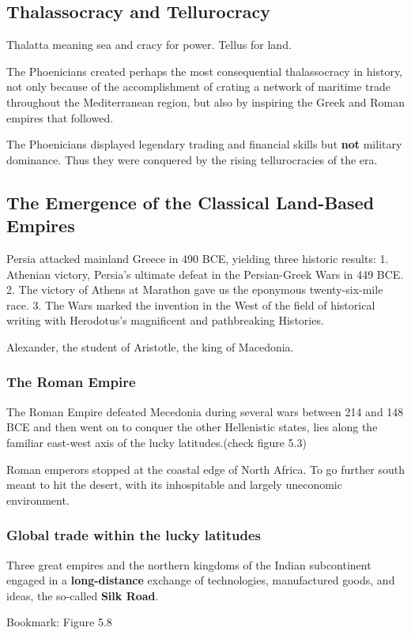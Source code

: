 \documentclass[12pt]{article}
\begin{document}
\subsection{Thalassocracy and Tellurocracy}
Thalatta meaning sea and cracy for power. Tellus for land.


The Phoenicians created perhaps the most consequential thalassocracy
in history, not only because of the accomplishment of crating a network
of maritime trade throughout the Mediterranean region, but also
by inspiring the Greek and Roman empires that followed.

The Phoenicians displayed legendary trading and financial skills but 
{\textbf {not}} military dominance. Thus they were conquered by the
rising tellurocracies of the era.



\subsection{The Emergence of the Classical Land-Based Empires}

Persia attacked mainland Greece in 490 BCE, yielding three historic
results:
1. Athenian victory, Persia's ultimate defeat in the Persian-Greek Wars
in 449 BCE. 2. The victory of Athens at  Marathon gave us the eponymous
twenty-six-mile race. 3. The Wars marked the invention in the West of
the field of historical writing with Herodotus's magnificent and
pathbreaking Histories.


Alexander, the student of Aristotle, the king of Macedonia.


\subsubsection{The Roman Empire}

The Roman Empire defeated Mecedonia during several wars between 214 
and 148 BCE and then went on to conquer the other Hellenistic states,
lies along the familiar east-west axis of the lucky latitudes.(check
figure 5.3)

Roman emperors stopped at the coastal edge of North Africa. To go further
south meant to hit the desert, with its inhospitable and largely
uneconomic environment.

\subsubsection{Global trade within the lucky latitudes}
Three great empires and the northern kingdoms of the Indian subcontinent
engaged in a {\textbf {long-distance}} exchange of technologies,
manufactured goods, and ideas, the so-called {\textbf {Silk Road}}.



Bookmark: Figure 5.8
\end{document}
